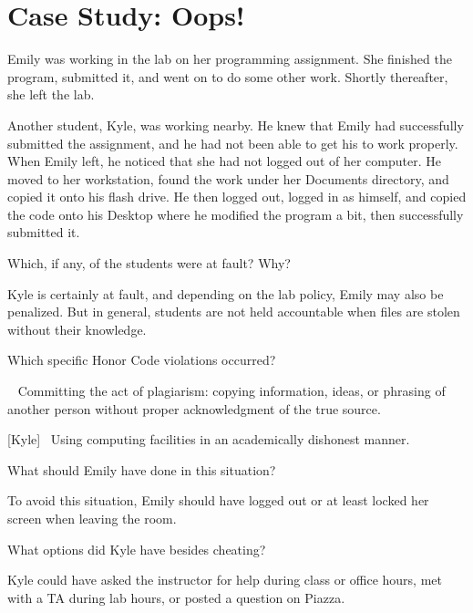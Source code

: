 \section*{Case Study: Oops!}

Emily was working in the lab on her programming assignment.
She finished the program, submitted it, and went on to do some other work.
Shortly thereafter, she left the lab.

\vspace{1em}

Another student, Kyle, was working nearby.
He knew that Emily had successfully submitted the assignment, and he had not been able to get his to work properly.
When Emily left, he noticed that she had not logged out of her computer.
He moved to her workstation, found the work under her Documents directory, and copied it onto his flash drive.
He then logged out, logged in as himself, and copied the code onto his Desktop where he modified the program a bit, then successfully submitted it.




\Q Which, if any, of the students were at fault? Why?

\begin{answer}[6em]
Kyle is certainly at fault, and depending on the lab policy, Emily may also be penalized.
But in general, students are not held accountable when files are stolen without their knowledge.
\end{answer}


\Q Which specific Honor Code violations occurred?

\begin{answer}[8em]
[Kyle]~ Committing the act of plagiarism: copying information, ideas, or phrasing of another person without proper acknowledgment of the true source.

\bigskip

[Kyle]~ Using computing facilities in an academically dishonest manner.
\end{answer}


\Q What should Emily have done in this situation?

\begin{answer}[6em]
To avoid this situation, Emily should have logged out or at least locked her screen when leaving the room.
\end{answer}


\Q What options did Kyle have besides cheating?

\begin{answer}[6em]
Kyle could have asked the instructor for help during class or office hours, met with a TA during lab hours, or posted a question on Piazza.
\end{answer}
